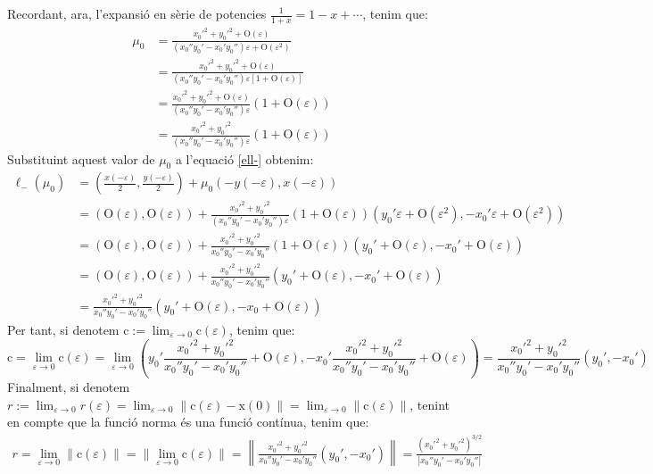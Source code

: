 \documentclass[10pt,a4paper]{article}
\newcommand{\vf}[1]{\boldsymbol{\mathrm{#1}}} %
\theoremstyle{definition}
\renewcommand{\O}[1]{\mathrm{O}\left(#1\right)}
\begin{document}
Recordant, ara, l'expansió en sèrie de potencies $\frac{1}{1+ x}=1-x+\cdots$, tenim que:
\begin{align*}
  \mu_0 & =\frac{{x_0'}^2+{y_0'}^2+\O{\varepsilon}}{\left(x_0''y_0'-x_0'y_0''\right)\varepsilon+\O{\varepsilon^2}}             \\
        & =\frac{{x_0'}^2+{y_0'}^2+\O{\varepsilon}}{\left(x_0''y_0'-x_0'y_0''\right)\varepsilon\left[1+\O{\varepsilon}\right]} \\
        & =\frac{{x_0'}^2+{y_0'}^2+\O{\varepsilon} }{\left(x_0''y_0'-x_0'y_0''\right)\varepsilon}(1+\O{\varepsilon})           \\
        & =\frac{{x_0'}^2+{y_0'}^2}{\left(x_0''y_0'-x_0'y_0''\right)\varepsilon}(1+\O{\varepsilon})
\end{align*}
Substituint aquest valor de $\mu_0$ a l'equació \eqref{ell-} obtenim:
\begin{align*}
  \ell_-(\mu_0) & =\left(\frac{x(-\varepsilon)}{2},\frac{y(-\varepsilon)}{2}\right)+\mu_0\left(-y(-\varepsilon),x(-\varepsilon)\right)                                                                                                \\
                & =\left(\O\varepsilon,\O\varepsilon\right)+\frac{{x_0'}^2+{y_0'}^2}{\left(x_0''y_0'-x_0'y_0''\right)\varepsilon}(1+\O{\varepsilon})\left(y_0'\varepsilon+\O{\varepsilon^2},-x_0'\varepsilon+\O{\varepsilon^2}\right) \\
                & =\left(\O\varepsilon,\O\varepsilon\right)+\frac{{x_0'}^2+{y_0'}^2}{x_0''y_0'-x_0'y_0''}(1+\O{\varepsilon})\left(y_0'+\O{\varepsilon},-x_0'+\O{\varepsilon}\right)                                                   \\
                & =\left(\O\varepsilon,\O\varepsilon\right)+\frac{{x_0'}^2+{y_0'}^2}{x_0''y_0'-x_0'y_0''}\left(y_0'+\O{\varepsilon},-x_0'+\O{\varepsilon}\right)                                                                      \\
                & =\frac{{x_0'}^2+{y_0'}^2}{x_0''y_0'-x_0'y_0''}(y_0'+\O\varepsilon,-x_0+\O\varepsilon)
\end{align*}
Per tant, si denotem $\displaystyle\vf{c}:=\lim_{\varepsilon\to 0}\vf{c}(\varepsilon)$, tenim que:
\begin{equation*}
  \vf{c}=\lim_{\varepsilon\to 0}\vf{c}(\varepsilon)=\lim_{\varepsilon\to 0}\left(y_0'\frac{{x_0'}^2+{y_0'}^2}{x_0''y_0'-x_0'y_0''}+\O{\varepsilon},-x_0'\frac{{x_0'}^2+{y_0'}^2}{x_0''y_0'-x_0'y_0''}+\O{\varepsilon}\right)=\frac{{x_0'}^2+{y_0'}^2}{x_0''y_0'-x_0'y_0''}\left(y_0',-x_0'\right)
\end{equation*}
Finalment, si denotem $\displaystyle r:=\lim_{\varepsilon\to 0}r(\varepsilon)=\lim_{\varepsilon\to 0}\|\vf{c}(\varepsilon)-\vf{x}(0)\|=\lim_{\varepsilon\to 0}\|\vf{c}(\varepsilon)\|$, tenint en compte que la funció norma és una funció contínua, tenim que:
\begin{align*}
  r=\lim_{\varepsilon\to 0}\|\vf{c}(\varepsilon)\|=\|\lim_{\varepsilon\to 0}\vf{c}(\varepsilon)\|=\left\|\frac{{x_0'}^2+{y_0'}^2}{x_0''y_0'-x_0'y_0''}\left(y_0',-x_0'\right)\right\|=\frac{{\left({x_0'}^2+{y_0'}^2\right)}^{3/2}}{|x_0''y_0'-x_0'y_0''|}
\end{align*}
\end{document}
